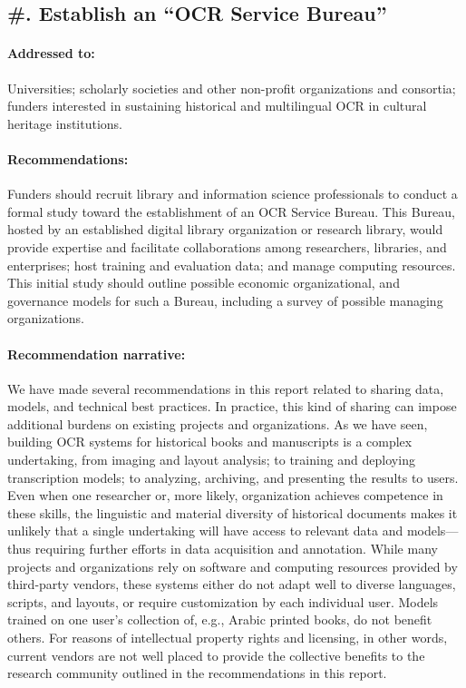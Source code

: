 \documentclass[twoside,11pt]{report}
\newcounter{reccounter}
\renewcommand{\thereccounter}{\arabic{reccounter}}
\newcommand{\recommend}[2]{\refstepcounter{reccounter}%
  \label{rec:#1}%
  \subsection{\#\thereccounter. #2}%
  \label{sec:rec-#1}}
\begin{document}
\recommend{bureau}{Establish an ``OCR Service Bureau''}

\paragraph{Addressed to:} Universities; scholarly societies and other non-profit organizations and consortia; funders interested in sustaining historical and multilingual OCR in cultural heritage institutions.

\paragraph{Recommendations:} Funders should recruit library and information science professionals to conduct a formal study toward the establishment of an OCR Service Bureau. This Bureau, hosted by an established digital library organization or research library, would provide expertise and facilitate collaborations among researchers, libraries, and enterprises; host training and evaluation data; and manage computing resources. This initial study should outline possible economic organizational, and governance models for such a Bureau, including a survey of possible managing organizations.

\paragraph{Recommendation narrative:}

We have made several recommendations in this report related to sharing data, models, and technical best practices. In practice, this kind of sharing can impose additional burdens on existing projects and organizations. As we have seen, building OCR systems for historical books and manuscripts is a complex undertaking, from imaging and layout analysis; to training and deploying transcription models; to analyzing, archiving, and presenting the results to users. Even when one researcher or, more likely, organization achieves competence in these skills, the linguistic and material diversity of historical documents makes it unlikely that a single undertaking will have access to relevant data and models---thus requiring further efforts in data acquisition and annotation. While many projects and organizations rely on software and computing resources provided by third-party vendors, these systems either do not adapt well to diverse languages, scripts, and layouts, or require customization by each individual user. Models trained on one user's collection of, e.g., Arabic printed books, do not benefit others. For reasons of intellectual property rights and licensing, in other words, current vendors are not well placed to provide the collective benefits to the research community outlined in the recommendations in this report.
\end{document}
